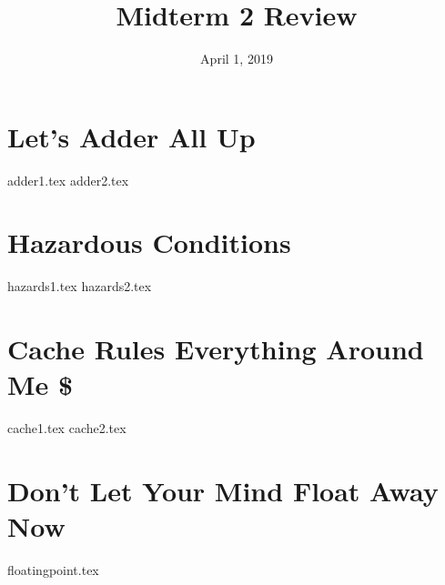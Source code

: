 \documentclass[11pt]{exam}
\title{Midterm 2 Review}
\date{April 1, 2019}
\begin{document}
\maketitle

\section{Let’s Adder All Up}
\begin{questions}
{adder1.tex}
{adder2.tex}
\end{questions}
\newpage

\section{Hazardous Conditions}
\begin{questions}
{hazards1.tex}
{hazards2.tex}
\end{questions}
\newpage

\section{Cache Rules Everything Around Me \$}
\begin{questions}
{cache1.tex}
{cache2.tex}
\end{questions}
\newpage

\section{Don’t Let Your Mind Float Away Now}
\begin{questions}
{floatingpoint.tex}
\end{questions}
\newpage
\end{document}
